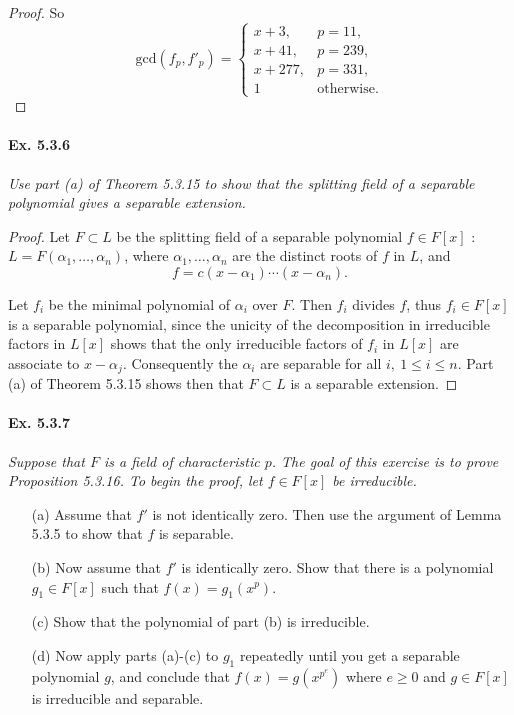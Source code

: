 \documentclass[11pt,a4paper]{article}
\begin{document}
\begin{proof}
\bigskip

So
$$
\mathrm{gcd}(f_p,f'_p) = 
\left\{
\begin{array}{ll}
  x+3,      & p = 11,    \\
  x + 41,  & p = 239,   \\
  x + 277, &  p = 331,  \\ 
  1  & \mathrm{otherwise.}
\end{array}
\right.
$$
\end{proof}

\paragraph{Ex. 5.3.6}

{\it Use part (a) of Theorem 5.3.15 to show that the splitting field of a separable polynomial gives a separable extension.
}

\begin{proof}
Let $F\subset L$ be the splitting field of a separable polynomial $f \in F[x]$ : $L=F(\alpha_1,\ldots,\alpha_n)$, where $\alpha_1,\ldots,\alpha_n$ are the distinct roots of $f$ in $L$, and
$$f = c(x-\alpha_1)\cdots(x-\alpha_n).$$

Let $f_i$ be the minimal polynomial of $\alpha_i$ over $F$. Then $f_i$ divides $f$, thus $f_i \in F[x]$ is a separable polynomial, since the unicity of the decomposition in irreducible factors in $L[x]$ shows that the only irreducible factors of $f_i$ in $L[x]$ are associate to $x-\alpha_j$. Consequently the $\alpha_i$ are separable for all $i,\ 1\leq i \leq n$. Part (a) of Theorem 5.3.15 shows then that $F\subset L$ is a separable extension.
\end{proof}

\paragraph{Ex. 5.3.7}

{\it Suppose that $F$ is a field of characteristic $p$. The goal of this exercise is to prove Proposition 5.3.16. To begin the proof, let $f \in F[x]$ be irreducible.
\begin{enumerate}
\item[(a)] Assume that $f'$ is not identically zero. Then use the argument of Lemma 5.3.5 to show that $f$ is separable.
\item[(b)] Now assume that $f'$ is identically zero. Show that there is a polynomial $g_1 \in F[x]$ such that $f(x) = g_1(x^p)$.
\item[(c)] Show that the polynomial of part (b) is irreducible.
\item[(d)] Now apply parts (a)-(c) to $g_1$ repeatedly until you get a separable polynomial $g$, and conclude that $f(x) = g(x^{p^e})$ where $e\geq 0$ and $g\in F[x]$ is irreducible and separable.
\end{enumerate}
}
\end{document}
